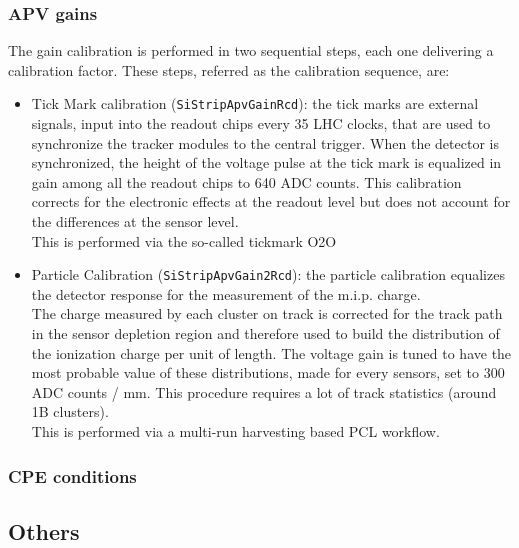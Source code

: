 \subsubsection{APV gains}
The gain calibration is performed in two sequential steps, each one delivering a
calibration factor. These steps, referred as the calibration sequence, are:

\begin{itemize}
\item Tick Mark calibration (\texttt{SiStripApvGainRcd}): the tick marks are external signals, input into the readout chips every 35 LHC clocks, that are used to synchronize the tracker modules to the central trigger.
When the detector is synchronized, the height of the voltage pulse at the tick mark is equalized in gain among all the readout chips to 640 ADC counts. This calibration corrects for the electronic effects at the readout level but does not account for the differences at the sensor level.\\
This is performed via the so-called tickmark O2O 
\item Particle Calibration (\texttt{SiStripApvGain2Rcd}): the particle calibration equalizes the detector response for the measurement of the m.i.p. charge. \\
The charge measured by each cluster on track is corrected for the track path in the sensor depletion region and therefore used to build the distribution of the ionization charge per unit of length. The voltage gain is tuned to have the most probable value of these distributions, made for every sensors, set to 300 ADC counts / mm. This procedure requires a lot of track statistics (around 1B clusters).\\
This is performed via a multi-run harvesting based PCL workflow.
\end{itemize}

\subsubsection{CPE conditions}

\subsection{Others}